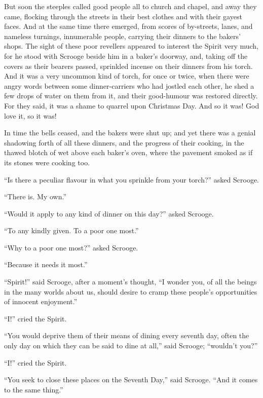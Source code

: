 \documentclass[paper=5.5in:8.5in,BCOR=7mm,twoside,DIV=calc,12pt,usegeometry]{scrbook} %
\begin{document}
But soon the steeples called good people all to church and chapel, and away they came, flocking through the streets in their best \newline clothes and with their gayest faces. And at the same time there emerged, from scores of by-streets, lanes, and nameless turnings, innumerable people, carrying their dinners to the bakers' shops. The sight of these poor revellers appeared to interest the Spirit very much, for he stood with Scrooge beside him in a baker's doorway, and, taking off the covers as their bearers passed, sprinkled incense on their dinners from his torch. And it was a very uncommon kind of torch, for once or twice, when there were angry words between some dinner-carriers who had jostled each other, he shed a few drops of water on them from it, and their good-humour was restored directly. For they said, it was a shame to quarrel upon Christmas Day. And so it was! God love it, so it was!

In time the bells ceased, and the bakers were shut up; and yet there was a genial shadowing forth of all these dinners, and the progress of their cooking, in the thawed blotch of wet above each baker's oven, where the pavement smoked as if its stones were cooking too.

\enquote{Is there a peculiar flavour in what you sprinkle from your torch?} asked Scrooge.

\enquote{There is. My own.}

\enquote{Would it apply to any kind of dinner on this day?} asked Scrooge.

\enquote{To any kindly given. To a poor one most.}

\enquote{Why to a poor one most?} asked Scrooge.

\enquote{Because it needs it most.}

\enquote{Spirit!} said Scrooge, after a moment's thought, \enquote{I wonder you, of all the beings in the many worlds about us, should desire to cramp these people's opportunities of innocent enjoyment.}

\enquote{I!} cried the Spirit.


\enquote{You would deprive them of their means of dining every seventh day, often the only day on which they can be said to dine at all,} said Scrooge; \enquote{wouldn't you?}

\enquote{I!} cried the Spirit.

\enquote{You seek to close these places on the Seventh Day,} said Scrooge. \enquote{And it comes to the same thing.}
\end{document}
